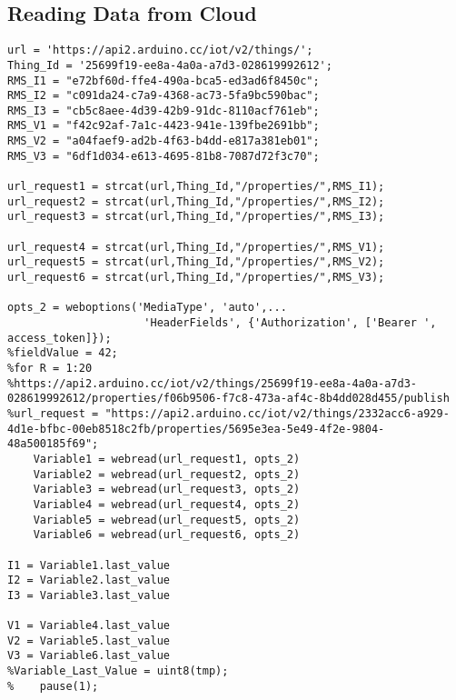 \subsection*{Reading Data from Cloud}
\label{READING FROM CLOUD}
\begin{lstlisting}[style=Matlab-Pyglike]
%:::::::::::::::READING FROM CLOUD:::::::::::::::
url = 'https://api2.arduino.cc/iot/v2/things/';
Thing_Id = '25699f19-ee8a-4a0a-a7d3-028619992612';
RMS_I1 = "e72bf60d-ffe4-490a-bca5-ed3ad6f8450c";
RMS_I2 = "c091da24-c7a9-4368-ac73-5fa9bc590bac";
RMS_I3 = "cb5c8aee-4d39-42b9-91dc-8110acf761eb";
RMS_V1 = "f42c92af-7a1c-4423-941e-139fbe2691bb";
RMS_V2 = "a04faef9-ad2b-4f63-b4dd-e817a381eb01";
RMS_V3 = "6df1d034-e613-4695-81b8-7087d72f3c70";

url_request1 = strcat(url,Thing_Id,"/properties/",RMS_I1);
url_request2 = strcat(url,Thing_Id,"/properties/",RMS_I2);
url_request3 = strcat(url,Thing_Id,"/properties/",RMS_I3);

url_request4 = strcat(url,Thing_Id,"/properties/",RMS_V1);
url_request5 = strcat(url,Thing_Id,"/properties/",RMS_V2);
url_request6 = strcat(url,Thing_Id,"/properties/",RMS_V3);

opts_2 = weboptions('MediaType', 'auto',...
                     'HeaderFields', {'Authorization', ['Bearer ', access_token]});
%fieldValue = 42;
%for R = 1:20
%https://api2.arduino.cc/iot/v2/things/25699f19-ee8a-4a0a-a7d3-028619992612/properties/f06b9506-f7c8-473a-af4c-8b4dd028d455/publish
%url_request = "https://api2.arduino.cc/iot/v2/things/2332acc6-a929-4d1e-bfbc-00eb8518c2fb/properties/5695e3ea-5e49-4f2e-9804-48a500185f69";
    Variable1 = webread(url_request1, opts_2)
    Variable2 = webread(url_request2, opts_2)
    Variable3 = webread(url_request3, opts_2)
    Variable4 = webread(url_request4, opts_2)
    Variable5 = webread(url_request5, opts_2)
    Variable6 = webread(url_request6, opts_2)
 
I1 = Variable1.last_value
I2 = Variable2.last_value
I3 = Variable3.last_value

V1 = Variable4.last_value
V2 = Variable5.last_value
V3 = Variable6.last_value
%Variable_Last_Value = uint8(tmp);
%    pause(1);
\end{lstlisting}

